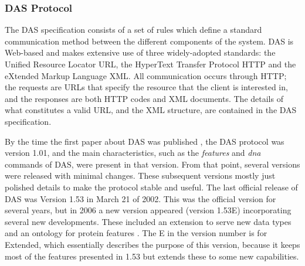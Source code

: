 
\subsubsection{DAS Protocol}
\label{ssec:DASprotocol}
The DAS specification consists of a set of rules which define a standard communication method between the different components of the system. DAS is Web-based and makes extensive use of three widely-adopted standards: the Unified Resource Locator URL, the HyperText Transfer Protocol HTTP and the eXtended Markup Language XML. All communication occurs through HTTP; the requests are URLs that specify the resource that the client is interested in, and the responses are both HTTP codes and XML documents. The details of what constitutes a valid URL, and the XML structure, are contained in the DAS specification.

By the time the first paper about DAS was published \cite{DOW2001}, the DAS protocol was version 1.01, and the main characteristics, such as the \emph{features} and \emph{dna} commands of DAS, were present in that version. From that point, several versions were released with minimal changes. These subsequent versions mostly just polished details to make the protocol stable and useful. The last official release of DAS was Version 1.53 in March 21 of 2002. This was the official version for several years, but in 2006 a new version appeared (version 1.53E) incorporating several new developments. These included an extension to serve new data types and an ontology for protein features \cite{JEN2008}. The E in the version number is for Extended, which essentially describes the purpose of this version, because it keeps most of the features presented in 1.53 but extends these to some new capabilities.


